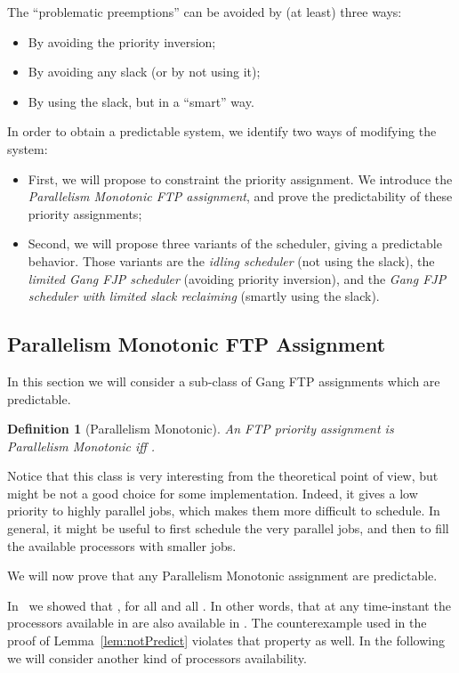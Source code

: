 \documentclass[a4paper]{article}
\newtheorem{definition}[theorem]{Definition}
\begin{document}
The ``problematic preemptions'' can be avoided by (at least) three ways:
\begin{itemize}
\item By avoiding the priority inversion;
\item By avoiding any slack (or by not using it);
\item By using the slack, but in a ``smart'' way.
\end{itemize}

In order to obtain a predictable system, we identify two ways of modifying the system:
\begin{itemize}
\item First, we will propose to constraint the priority assignment. We introduce the \emph{Parallelism Monotonic FTP assignment}, and prove the predictability of these priority assignments;
\item Second, we will propose three variants of the scheduler, giving a predictable behavior. Those variants are the \emph{idling scheduler} (not using the slack), the \emph{limited Gang FJP scheduler} (avoiding priority inversion), and the \emph{Gang FJP scheduler with limited slack reclaiming} (smartly using the slack).
\end{itemize}


\subsection{Parallelism Monotonic FTP Assignment}
In this section we will consider a sub-class of Gang FTP assignments which are predictable.
\begin{definition}[Parallelism Monotonic]
An FTP priority assignment is \emph{Parallelism Monotonic} iff . 
\end{definition}

Notice that this class is very interesting from the theoretical point of view, but might be not a good choice for some implementation. Indeed, it gives a low priority to highly parallel jobs, which makes them more difficult to schedule. In general, it might be useful to first schedule the very parallel jobs, and then to fill the available processors with smaller jobs.

We will now prove that any Parallelism Monotonic assignment are predictable.

In~\cite{Cucu-Grosjean2009Predictability-} we showed that , for all  and all . In other words, that at any time-instant the processors available in  are also available in . The counterexample used in the proof of Lemma~\ref{lem:notPredict} violates that property as well. In the following we will consider another kind of processors availability.
\end{document}
